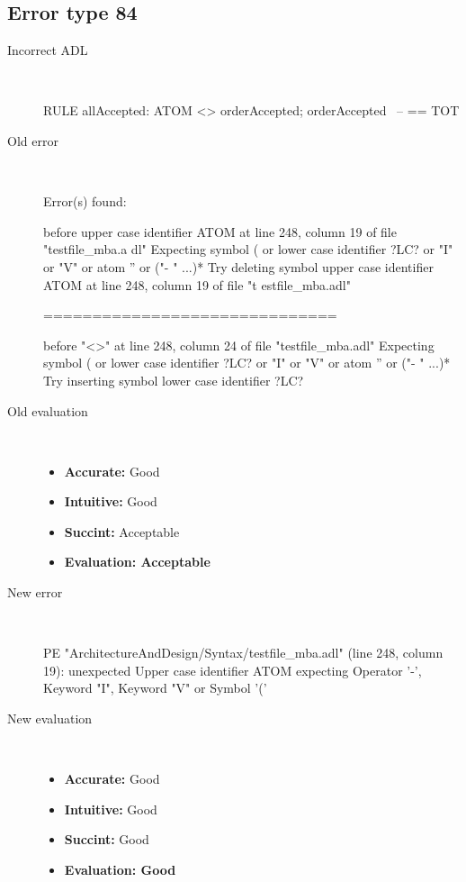 \hrulefill

\subsection{Error type 84}
  \begin{description}
  \item[Incorrect ADL]~\\
\begin{adl}
RULE allAccepted: ATOM <> orderAccepted; orderAccepted~ -- == TOT\end{adl}
  \item[Old error]~\\
\begin{haskell}
Error(s) found:

before upper case identifier ATOM at line 248, column 19 of file "testfile_mba.a
dl"
Expecting symbol ( or lower case identifier ?LC? or "I" or "V" or atom '' or ("-
" ...)*
Try deleting symbol upper case identifier ATOM at line 248, column 19 of file "t
estfile_mba.adl"

==============================

before "<>" at line 248, column 24 of file "testfile_mba.adl"
Expecting symbol ( or lower case identifier ?LC? or "I" or "V" or atom '' or ("-
" ...)*
Try inserting symbol lower case identifier ?LC?
\end{haskell}
  \item[Old evaluation]~\\
    \begin{itemize}
    \item \textbf{Accurate:} Good
    \item \textbf{Intuitive:} Good
    \item \textbf{Succint:} Acceptable
    \item \textbf{Evaluation: Acceptable}
    \end{itemize}
  \item[New error]~\\
\begin{haskell}
PE "ArchitectureAndDesign/Syntax/testfile_mba.adl" (line 248, column 19):
unexpected Upper case identifier ATOM
expecting Operator '-', Keyword "I", Keyword "V" or Symbol '('
\end{haskell}
  \item[New evaluation]~\\
    \begin{itemize}
    \item \textbf{Accurate:} Good
    \item \textbf{Intuitive:} Good
    \item \textbf{Succint:} Good
    \item \textbf{Evaluation: Good
}
    \end{itemize}
  \end{description}

